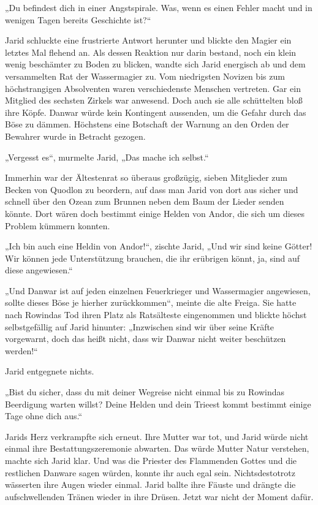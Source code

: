 „Du befindest dich in einer Angstspirale. Was, wenn es einen Fehler macht und in wenigen Tagen bereits Geschichte ist?“

Jarid schluckte eine frustrierte Antwort herunter und blickte den Magier ein letztes Mal flehend an. Als dessen Reaktion nur darin bestand, noch ein klein wenig beschämter zu Boden zu blicken, wandte sich Jarid energisch ab und dem versammelten Rat der Wassermagier zu. Vom niedrigsten Novizen bis zum höchstrangigen Absolventen waren verschiedenste Menschen vertreten. Gar ein Mitglied des sechsten Zirkels war anwesend. Doch auch sie alle schüttelten bloß ihre Köpfe. Danwar würde kein Kontingent aussenden, um die Gefahr durch das Böse zu dämmen. Höchstens eine Botschaft der Warnung an den Orden der Bewahrer wurde in Betracht gezogen.

„Vergesst es“, murmelte Jarid, „Das mache ich selbst.“

Immerhin war der Ältestenrat so überaus großzügig, sieben Mitglieder zum Becken von Quodlon zu beordern, auf dass man Jarid von dort aus sicher und schnell über den Ozean zum Brunnen neben dem Baum der Lieder senden könnte. Dort wären doch bestimmt einige Helden von Andor, die sich um dieses Problem kümmern konnten.

„Ich bin auch eine Heldin von Andor!“, zischte Jarid, „Und wir sind keine Götter! Wir können jede Unterstützung brauchen, die ihr erübrigen könnt, ja, sind auf diese angewiesen.“

„Und Danwar ist auf jeden einzelnen Feuerkrieger und Wassermagier angewiesen, sollte dieses Böse je hierher zurückkommen“, meinte die alte Freiga. Sie hatte nach Rowindas Tod ihren Platz als Ratsälteste eingenommen und blickte höchst selbstgefällig auf Jarid hinunter: „Inzwischen sind wir über seine Kräfte vorgewarnt, doch das heißt nicht, dass wir Danwar nicht weiter beschützen werden!“

Jarid entgegnete nichts.

„Bist du sicher, dass du mit deiner Wegreise nicht einmal bis zu Rowindas Beerdigung warten willst? Deine Helden und dein Trieest kommt bestimmt einige Tage ohne dich aus.“

Jarids Herz verkrampfte sich erneut. Ihre Mutter war tot, und Jarid würde nicht einmal ihre Bestattungszeremonie abwarten. Das würde Mutter Natur verstehen, machte sich Jarid klar. Und was die Priester des Flammenden Gottes und die restlichen Danware sagen würden, konnte ihr auch egal sein. Nichtsdestotrotz wässerten ihre Augen wieder einmal. Jarid ballte ihre Fäuste und drängte die aufschwellenden Tränen wieder in ihre Drüsen. Jetzt war nicht der Moment dafür.

